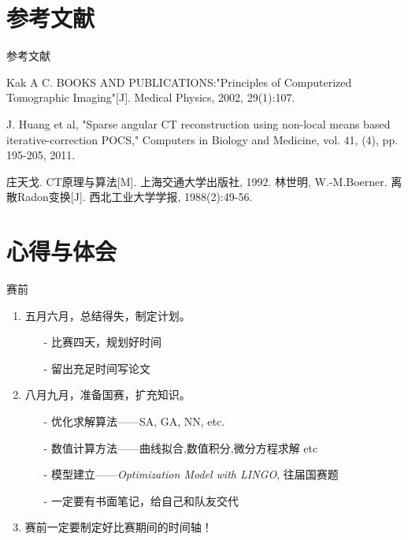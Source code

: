 \documentclass{beamer} %
\begin{document}
\section{参考文献}
\begin{frame}{参考文献}
	\begin{thebibliography}{0}
		    
		Kak A C. BOOKS AND PUBLICATIONS:"Principles of Computerized Tomographic Imaging"[J]. Medical Physics, 2002, 29(1):107.
		    
		J. Huang et al, "Sparse angular CT reconstruction using non-local means based iterative-correction POCS," Computers in Biology and Medicine, vol. 41, (4), pp. 195-205, 2011.
		    
		庄天戈. CT原理与算法[M]. 上海交通大学出版社, 1992.
		林世明, W.-M.Boerner. 离散Radon变换[J]. 西北工业大学学报, 1988(2):49-56.
	\end{thebibliography}
\end{frame} %


\section{心得与体会}
\begin{frame}{赛前}
	\begin{enumerate}
	  \item 五月六月，总结得失，制定计划。
		\begin{enumerate}
		  \item[-] 比赛四天，规划好时间
		  \item[-] 留出充足时间写论文
		\end{enumerate}
	  \item 八月九月，准备国赛，扩充知识。
		\begin{enumerate}
		  \item[-] 优化求解算法——SA, GA, NN, etc.
		  \item[-] 数值计算方法——曲线拟合,数值积分,微分方程求解 etc
		  \item[-] 模型建立——\emph{Optimization Model with LINGO}, 往届国赛题
		  \item[-] 一定要有书面笔记，给自己和队友交代
		\end{enumerate}
	  \item 赛前一定要制定好比赛期间的时间轴！
	\end{enumerate}
  \end{frame}
\end{document}
